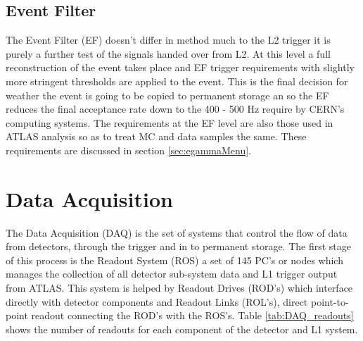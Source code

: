 

	\subsection*{Event Filter}
		The Event Filter (EF) doesn't differ in method much to the L2 trigger it is purely a further test of the signals handed over from L2. At this level a full reconstruction of the event takes place and EF trigger requirements with slightly more stringent thresholds are applied to the event. This is the final decision for weather the event is going to be copied to permanent storage an so the EF reduces the final acceptance rate down to the 400 - 500 Hz require by CERN's computing systems. The requirements at the EF level are also those used in ATLAS analysis so as to treat MC and data samples the same. These requirements are discussed in section \ref{sec:egammaMenu}.
	



\section{Data Acquisition}
\label{sec:trig_DAQ}

	The Data Acquisition (DAQ) is the set of systems that control the flow of data from detectors, through the trigger and in to permanent storage. The first stage of this process is the Readout System (ROS) a set of 145 PC's or nodes which manages the collection of all detector sub-system data and L1 trigger output from ATLAS. This system is helped by Readout Drives (ROD's) which interface directly with detector components and Readout Links (ROL's), direct point-to-point readout connecting the ROD's with the ROS's. Table \ref{tab:DAQ_readouts} shows the number of readouts for each component of the detector and L1 system.


